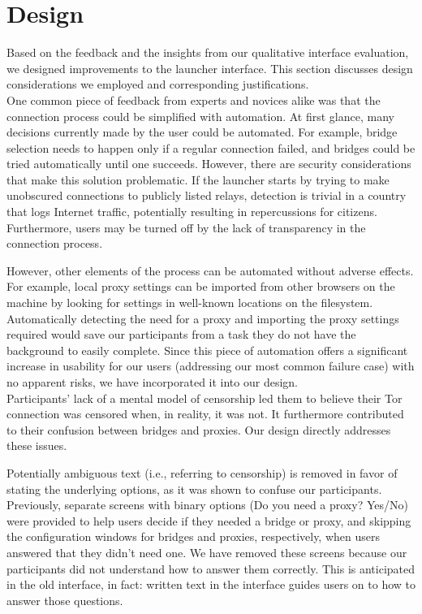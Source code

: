 \documentclass{template}
\begin{document}
\section{Design}
Based on the feedback and the insights from our qualitative interface evaluation,
 we designed improvements to the launcher interface. This section
discusses design considerations we employed and corresponding justifications. \\

One common piece of feedback from experts and novices alike was that the
connection process could be simplified with automation. At first glance, many
decisions currently made by the user could be automated. For example, bridge
selection needs to happen only if a regular connection failed, and bridges could
be tried automatically until one succeeds. However, there are security
considerations that make this solution problematic. If the launcher starts by
trying to make unobscured connections to publicly listed relays, detection is
trivial in a country that logs Internet traffic, potentially resulting in
repercussions for citizens. Furthermore, users may be turned off by the
lack of transparency in the connection process.

However, other elements of the process can be automated without adverse effects.
For example, local proxy settings can be imported from other browsers on the
machine by looking for settings in well-known locations on the filesystem. Automatically
detecting the need for a proxy and importing the proxy settings required would save
our participants from a task they do not have the background to easily complete. 
Since this piece of automation offers a significant increase in usability for our users
(addressing our most common failure case) with no apparent risks, we have incorporated it
into our design. \\

Participants' lack of a mental model of censorship led them to believe their
Tor connection was censored when, in reality, it was not. It furthermore contributed
to their confusion between bridges and proxies. Our design directly addresses
these issues.

Potentially ambiguous text (i.e., referring to censorship) is removed in favor
of stating the underlying options, as it was shown to confuse our participants.
Previously, separate screens with binary options (Do you need a proxy? Yes/No) 
were provided to help users decide if they needed a bridge or proxy, and skipping
the configuration windows for bridges and proxies, respectively, when users
answered that they didn't need one. We have removed these screens
because our participants did not understand how to answer them correctly. This is 
anticipated in the old interface, in fact: written text in the interface guides users on to 
how to answer those questions.  
\end{document}
